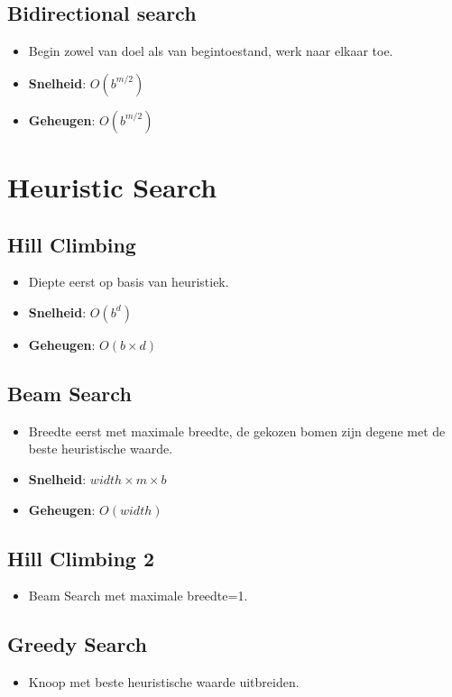 \documentclass{report}
\begin{document}
      \subsection{Bidirectional search}
        \begin{itemize}
          \item Begin zowel van doel als van begintoestand, werk naar elkaar toe.
          \item \textbf{Snelheid}: $O(b^{m/2})$
          \item \textbf{Geheugen}: $O(b^{m/2})$
        \end{itemize}

  \section{Heuristic Search}
    \subsection{Hill Climbing}
      \begin{itemize}
        \item Diepte eerst op basis van heuristiek.
        \item \textbf{Snelheid}: $O(b^{d})$
        \item \textbf{Geheugen}: $O(b \times d)$
      \end{itemize}
    \subsection{Beam Search}
      \begin{itemize}
        \item Breedte eerst met maximale breedte, de gekozen bomen zijn degene met de beste heuristische waarde.
        \item \textbf{Snelheid}: $width \times m \times b$
        \item \textbf{Geheugen}: $O(width)$
      \end{itemize}
    \subsection{Hill Climbing 2}
      \begin{itemize}
        \item Beam Search met maximale breedte=1.
      \end{itemize}
    \subsection{Greedy Search}
      \begin{itemize}
        \item Knoop met beste heuristische waarde uitbreiden.
      \end{itemize}
\end{document}
